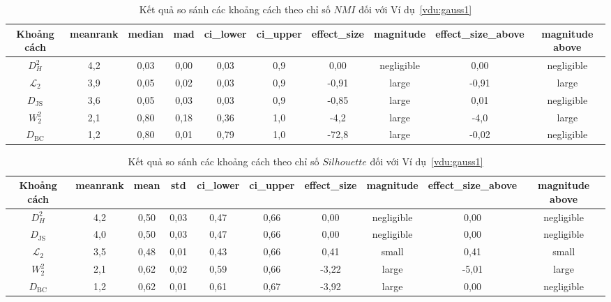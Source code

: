 \documentclass[a4paper,oneside]{book} %
\theoremstyle{plain}
\theoremstyle{plain}
\theoremstyle{nonumberplain}
\begin{document}
\begin{spacing}{1.0}
\begin{landscape}
	
	\begin{table}[H]
		\centering
		\fontsize{11pt}{11pt}\selectfont
		\caption{Kết quả so sánh các khoảng cách theo chỉ số $NMI$ đối với Ví dụ~\ref{vdu:gauss1}}
		\begin{tabular}{cccccccccc}
			\toprule
			Khoảng cách & meanrank & median & mad & ci\_lower & ci\_upper & effect\_size & magnitude & effect\_size\_above & magnitude above \\
			\midrule
			$D^2_{H}$                 & 4{,}2 & 0{,}03 & 0{,}00 & 0{,}03 & 0{,}9  &  0{,}00 & negligible &  0{,}00 & negligible \\
			$\mathcal{L}_2$         & 3{,}9 & 0{,}05 & 0{,}02 & 0{,}03 & 0{,}9  & -0{,}91 & large      & -0{,}91 & large \\
			$D_{\mathrm{JS}}$       & 3{,}6 & 0{,}05 & 0{,}03 & 0{,}03 & 0{,}9  & -0{,}85 & large      &  0{,}01 & negligible \\
			$W^2_2$                 & 2{,}1 & 0{,}80 & 0{,}18 & 0{,}36 & 1{,}0  & -4{,}2  & large      & -4{,}0  & large \\
			$D_{\mathrm{BC}}$       & 1{,}2 & 0{,}80 & 0{,}01 & 0{,}79 & 1{,}0  & -72{,}8 & large      & -0{,}02 & negligible \\
			\bottomrule
		\end{tabular}
	\end{table}
	
	
	\begin{table}[H]
		\centering
		\fontsize{11pt}{14pt}\selectfont
		\caption{Kết quả so sánh các khoảng cách theo chỉ số $Silhouette$ đối với Ví dụ~\ref{vdu:gauss1}}
		\begin{tabular}{cccccccccc}
			\toprule
			{Khoảng cách} & meanrank & mean & std & ci\_lower & ci\_upper & effect\_size & magnitude & effect\_size\_above & magnitude above \\
			\midrule
			$D^2_{H}$                 & 4{,}2 & 0{,}50 & 0{,}03 & 0{,}47 & 0{,}66 &  0{,}00 & negligible &  0{,}00 & negligible \\
			$D_{\mathrm{JS}}$       & 4{,}0 & 0{,}50 & 0{,}03 & 0{,}47 & 0{,}66 &  0{,}00 & negligible &  0{,}00 & negligible \\
			$\mathcal{L}_2$         & 3{,}5 & 0{,}48 & 0{,}01 & 0{,}43 & 0{,}66 &  0{,}41 & small      &  0{,}41 & small \\
			$W^2_2$                 & 2{,}1 & 0{,}62 & 0{,}02 & 0{,}59 & 0{,}66 & -3{,}22 & large      & -5{,}01 & large \\
			$D_{\mathrm{BC}}$       & 1{,}2 & 0{,}62 & 0{,}01 & 0{,}61 & 0{,}67 & -3{,}92 & large      &  0{,}00 & negligible \\
			\bottomrule
		\end{tabular}
	\end{table}
	

\end{landscape}
\end{spacing}
\end{document}
